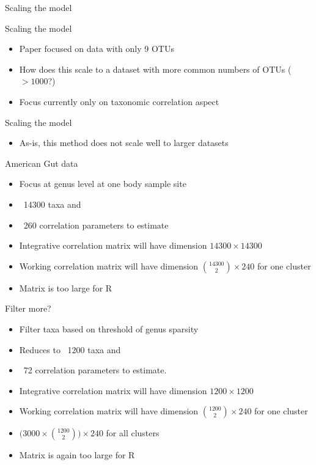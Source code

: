 \documentclass{beamer}
\begin{document}

\begin{frame}[t]{Scaling the model}

\end{frame}

\begin{frame}[t]{Scaling the model}
  \begin{itemize}
    \item Paper focused on data with only 9 OTUs
    \item How does this scale to a dataset with more common numbers of OTUs ($>1000$?)
    \item Focus currently only on taxonomic correlation aspect
  \end{itemize}
\end{frame}

\begin{frame}[t]{Scaling the model}
 \begin{itemize}
   \item As-is, this method does not scale well to larger datasets
 \end{itemize}
\end{frame}

\begin{frame}{American Gut data}
  \begin{itemize}
    \item Focus at genus level at one body sample site
    \item ~14300 taxa and
    \item ~260 correlation parameters to estimate
    \item Integrative correlation matrix will have dimension $14300 \times 14300$
    \item Working correlation matrix will have dimension $\binom{14300}{2} \times 240$ for one cluster
    \item Matrix is too large for R
  \end{itemize}
\end{frame}

\begin{frame}{Filter more?}
  \begin{itemize}
    \item Filter taxa based on threshold of genus sparsity
    \item Reduces to ~1200 taxa and
    \item ~72 correlation parameters to estimate.
    \item Integrative correlation matrix will have dimension $1200 \times 1200$
    \item Working correlation matrix will have dimension $\binom{1200}{2} \times 240$ for one cluster
    \item $\bigg(3000\times \binom{1200}{2}\bigg) \times 240$ for all clusters
    \item Matrix is again too large for R
  \end{itemize}
\end{frame}
\end{document}
